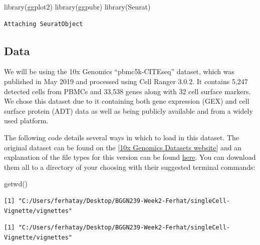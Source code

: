 \documentclass[
  letterpaper,
  DIV=11,
  numbers=noendperiod]{scrartcl}
\newenvironment{Shaded}{\begin{snugshade}}{\end{snugshade}}
\newcommand{\FunctionTok}[1]{\textcolor[rgb]{0.28,0.35,0.67}{#1}}
\newcommand{\NormalTok}[1]{\textcolor[rgb]{0.00,0.23,0.31}{#1}}
\begin{document}
\begin{Shaded}
\begin{Highlighting}[]
\FunctionTok{library}\NormalTok{(ggplot2)}
\FunctionTok{library}\NormalTok{(ggpubr)}
\FunctionTok{library}\NormalTok{(Seurat)}
\end{Highlighting}
\end{Shaded}

\begin{verbatim}
Attaching SeuratObject
\end{verbatim}

\hypertarget{data}{%
\subsection{Data}\label{data}}

We will be using the 10x Genomics ``pbmc5k-CITEseq'' dataset, which was
published in May 2019 and processed using Cell Ranger 3.0.2. It contains
5,247 detected cells from PBMCs and 33,538 genes along with 32 cell
surface markers. We chose this dataset due to it containing both gene
expression (GEX) and cell surface protein (ADT) data as well as being
publicly available and from a widely used platform.

The following code details several ways in which to load in this
dataset. The original dataset can be found on the
{[}\href{https://support.10xgenomics.com/single-cell-gene-expression/datasets/3.0.2/5k_pbmc_protein_v3}{10x
Genomics Datasets website}{]} and an explanation of the file types for
this version can be found
\href{https://support.10xgenomics.com/single-cell-gene-expression/software/pipelines/3.0/output/overview}{here}.
You can download them all to a directory of your choosing with their
suggested terminal commands:

\begin{Shaded}
\begin{Highlighting}[]
\FunctionTok{getwd}\NormalTok{()}
\end{Highlighting}
\end{Shaded}

\begin{verbatim}
[1] "C:/Users/ferhatay/Desktop/BGGN239-Week2-Ferhat/singleCell-Vignette/vignettes"
\end{verbatim}

\begin{verbatim}
[1] "C:/Users/ferhatay/Desktop/BGGN239-Week2-Ferhat/singleCell-Vignette/vignettes"
\end{verbatim}
\end{document}
